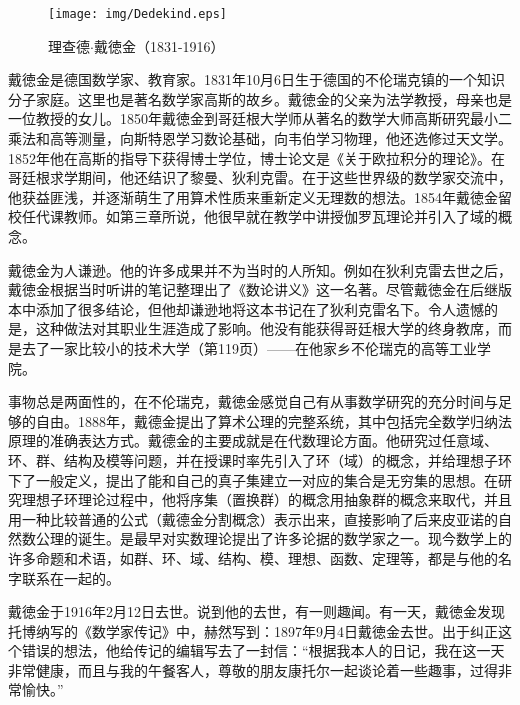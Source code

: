 \documentclass{article}
\begin{document}
\begin{figure}
 \centering
 \texttt{[image: img/Dedekind.eps]}
 \captionsetup{labelformat=empty}
 \caption{理查德$\cdot$戴徳金（1831-1916）}
 \label{fig:Dedekind}
\end{figure}

戴徳金是德国数学家、教育家。1831年10月6日生于德国的不伦瑞克镇的一个知识分子家庭。这里也是著名数学家高斯的故乡。戴徳金的父亲为法学教授，母亲也是一位教授的女儿。1850年戴徳金到哥廷根大学师从著名的数学大师高斯研究最小二乘法和高等测量，向斯特恩学习数论基础，向韦伯学习物理，他还选修过天文学。1852年他在高斯的指导下获得博士学位，博士论文是《关于欧拉积分的理论》。在哥廷根求学期间，他还结识了黎曼、狄利克雷。在于这些世界级的数学家交流中，他获益匪浅，并逐渐萌生了用算术性质来重新定义无理数的想法。1854年戴徳金留校任代课教师。如第三章所说，他很早就在教学中讲授伽罗瓦理论并引入了域的概念。

戴徳金为人谦逊。他的许多成果并不为当时的人所知。例如在狄利克雷去世之后，戴徳金根据当时听讲的笔记整理出了《数论讲义》这一名著。尽管戴徳金在后继版本中添加了很多结论，但他却谦逊地将这本书记在了狄利克雷名下。令人遗憾的是，这种做法对其职业生涯造成了影响。他没有能获得哥廷根大学的终身教席，而是去了一家比较小的技术大学（\cite{Stepanov}第119页）——在他家乡不伦瑞克的高等工业学院。

事物总是两面性的，在不伦瑞克，戴徳金感觉自己有从事数学研究的充分时间与足够的自由。1888年，戴德金提出了算术公理的完整系统，其中包括完全数学归纳法原理的准确表达方式。戴德金的主要成就是在代数理论方面。他研究过任意域、环、群、结构及模等问题，并在授课时率先引入了环（域）的概念，并给理想子环下了一般定义，提出了能和自己的真子集建立一对应的集合是无穷集的思想。在研究理想子环理论过程中，他将序集（置换群）的概念用抽象群的概念来取代，并且用一种比较普通的公式（戴德金分割概念）表示出来，直接影响了后来皮亚诺的自然数公理的诞生。是最早对实数理论提出了许多论据的数学家之一。现今数学上的许多命题和术语，如群、环、域、结构、模、理想、函数、定理等，都是与他的名字联系在一起的。

戴徳金于1916年2月12日去世。说到他的去世，有一则趣闻。有一天，戴徳金发现托博纳写的《数学家传记》中，赫然写到：1897年9月4日戴徳金去世。出于纠正这个错误的想法，他给传记的编辑写去了一封信：“根据我本人的日记，我在这一天非常健康，而且与我的午餐客人，尊敬的朋友康托尔一起谈论着一些趣事，过得非常愉快。”\cite{HanXueTao16}
\end{document}
